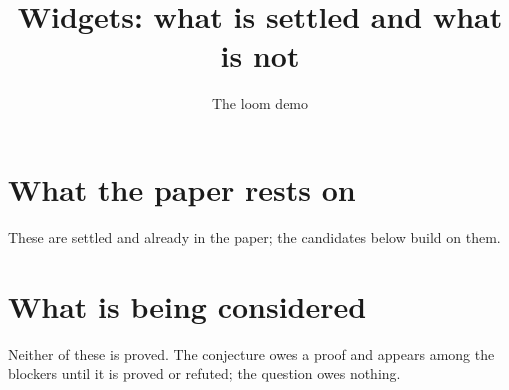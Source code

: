 \documentclass{amsart}
\title{Widgets: what is settled and what is not}
\author{The loom demo}
\theoremstyle{plain}
\theoremstyle{definition}
\theoremstyle{remark}
\begin{document}
\maketitle

\section{What the paper rests on}

These are settled and already in the paper; the candidates below build on them.





\section{What is being considered}

Neither of these is proved. The conjecture owes a proof and appears among the blockers until it is proved or refuted; the question owes nothing.




\end{document}
